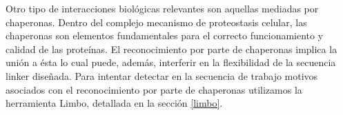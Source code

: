 Otro tipo de interacciones biológicas relevantes son aquellas mediadas por chaperonas.
Dentro del complejo mecanismo de proteostasis celular, las chaperonas son elementos fundamentales para el correcto funcionamiento y calidad de las proteínas.
El reconocimiento por parte de chaperonas implica la unión a ésta lo cual puede, además, interferir en la flexibilidad de la secuencia linker diseñada.
Para intentar detectar en la secuencia de trabajo motivos asociados con el reconocimiento por parte de chaperonas utilizamos la herramienta Limbo, detallada en la sección \ref{limbo}. 


% 























